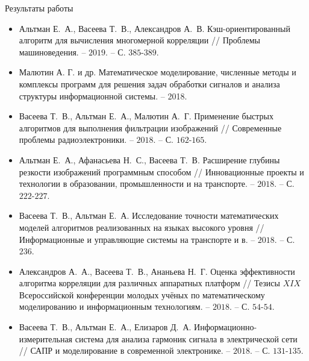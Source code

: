 \begin{frame}{Результаты работы}
\scriptsize{
\begin{itemize}
	\item Альтман Е.~А., Васеева Т.~В., Александров А.~В. Кэш-ориентированный алгоритм для вычисления многомерной корреляции // Проблемы машиноведения. – $2019$. – С. $385$-$389$.
	
	\item Малютин А. Г. и др. Математическое моделирование, численные методы и комплексы программ для решения задач обработки сигналов и анализа структуры информационной системы. – 2018.
	
	\item Васеева Т.~В., Альтман Е.~А., Малютин А.~Г. Применение быстрых алгоритмов для выполнения фильтрации изображений // Современные проблемы радиоэлектроники. – $2018$. – С. $162$-$165$.
	
	\item Альтман Е.~А., Афанасьева Н.~С., Васеева Т.~В. Расширение глубины резкости изображений программным способом // Инновационные проекты и технологии в образовании, промышленности и на транспорте. – $2018$. – С. $222$-$227$.
	
	\item Васеева Т.~В., Альтман Е.~А. Исследование точности математических моделей алгоритмов реализованных на языках высокого уровня // Информационные и управляющие системы на транспорте и в. – $2018$. – С. $236$.
	
	\item Александров А.~А., Васеева Т.~В., Ананьева Н.~Г. Оценка эффективности алгоритма корреляции для различных аппаратных платформ // Тезисы $XIX$ Всероссийской конференции молодых учёных по математическому моделированию и информационным технологиям. – $2018$. – С. $54$-$54$.
	
	\item Васеева Т.~В., Альтман Е.~А., Елизаров Д.~А. Информационно-измерительная система для анализа гармоник сигнала в электрической сети // САПР и моделирование в современной электронике. – $2018$. – С. $131$-$135$.	
\end{itemize}}
\end{frame}

